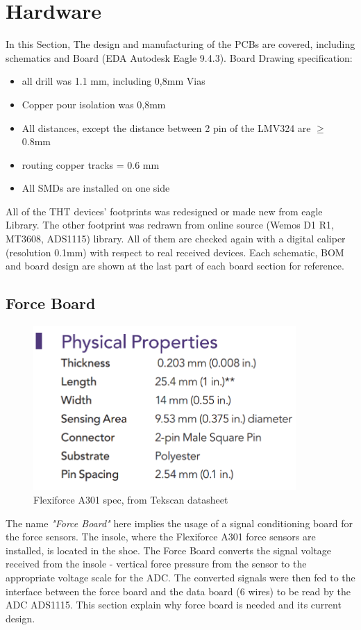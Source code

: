 \documentclass[12 pt, a4paper]{thesis}
\begin{document}
\section{Hardware}
In this Section, The design and manufacturing of the PCBs are covered, including schematics and Board (EDA Autodesk Eagle 9.4.3). Board Drawing specification:
\begin{itemize}
\item{all drill was 1.1 mm, including 0,8mm Vias }
\item{Copper pour isolation was 0,8mm }
\item{All distances, except the distance between 2 pin of the LMV324 are $\geqslant$ 0.8mm}
\item{routing copper tracks = 0.6 mm}
\item{All SMDs are installed on one side}
\end{itemize}
All of the THT devices' footprints was redesigned or made new from eagle Library. The other footprint was redrawn from online source (Wemos D1 R1, MT3608, ADS1115) library\cite{diy}. All of them are checked again with a digital caliper (resolution 0.1mm) with respect to real received devices.
Each schematic, BOM and board design are shown at the last part of each board section for reference.
\subsection{Force Board}
\begin{figure}[hbt]
\begin{center}
\includegraphics[width = 100mm]{A301_spec.png}
\caption{Flexiforce A301 spec, from Tekscan datasheet}
\end{center}
\end{figure}
The name \textit{"Force Board"} here implies the usage of a signal conditioning board for the force sensors. The insole, where the Flexiforce A301 force sensors are installed, is located in the shoe. The Force Board converts the signal voltage received from the insole - vertical force pressure from the sensor to the appropriate voltage scale for the ADC. The converted signals were then fed to the interface between the force board and the data board (6 wires) to be read by the ADC ADS1115. This section explain why force board is needed and its current design. 
\end{document}
